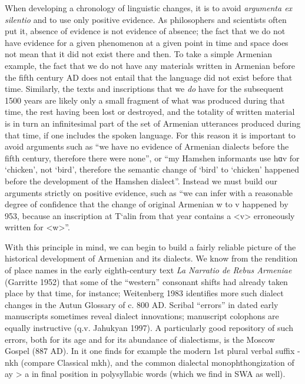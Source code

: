 \begin{exe}
When developing a chronology of linguistic changes, it is to avoid \textit{argumenta ex silentio} and to use only positive evidence. As philosophers and scientists often put it, absence of evidence is not evidence of absence; the fact that we do not have evidence for a given phenomenon at a given point in time and space does not mean that it did not exist there and then. To take a simple Armenian example, the fact that we do not have any materials written in Armenian before the fifth century AD does not entail that the language did not exist before that time. Similarly, the texts and inscriptions that we \textit{do} have for the subsequent 1500 years are likely only a small fragment of what was produced during that time, the rest having been lost or destroyed, and the totality of written material is in turn an infinitesimal part of the set of Armenian utterances produced during that time, if one includes the spoken language. For this reason it is important to avoid arguments such as “we have no evidence of Armenian dialects before the fifth century, therefore there were none”, or “my Hamshen informants use hɑv for ‘chicken’, not ‘bird’, therefore the semantic change of ‘bird’ to ‘chicken’ happened before the development of the Hamshen dialect”. Instead we must build our arguments strictly on positive evidence, such as “we can infer with a reasonable degree of confidence that the change of original Armenian w to v happened by 953, because an inscription at T‘alin from that year contains a <v> erroneously written for <w>”.

With this principle in mind, we can begin to build a fairly reliable picture of the historical development of Armenian and its dialects. We know from the rendition of place names in the early eighth-century text \textit{La Narratio de Rebus Armeniae} (Garritte 1952) that some of the “western” consonant shifts had already taken place by that time, for instance; Weitenberg 1983 identifies more such dialect changes in the Autun Glossary of c. 800 AD. Scribal “errors” in dated early manuscripts sometimes reveal dialect innovations; manuscript colophons are equally instructive (q.v. Jahukyan 1997). A particularly good repository of such errors, both for its age and for its abundance of dialectisms, is the Moscow Gospel (887 AD). In it one finds for example the modern 1st plural verbal suffix -nkh (compare Classical  mkh), and the common dialectal monophthongization of ay > a in final position in polysyllabic words (which we find in SWA as well). 


\end{exe}
